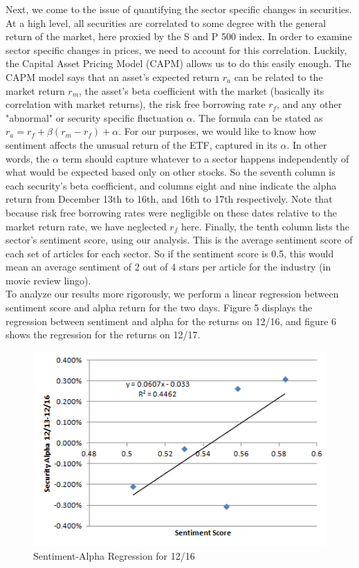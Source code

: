 \documentclass[pageno]{jpaper}
\begin{document}
\indent Next, we come to the issue of quantifying the sector specific changes in securities. At a high level, all securities are correlated to some degree with the general return of the market, here proxied by the S and P 500 index. In order to examine sector specific changes in prices, we need to account for this correlation. Luckily, the Capital Asset Pricing Model (CAPM) allows us to do this easily enough. The CAPM model says that an asset's expected return $r_a$ can be related to the market return $r_m$, the asset's beta coefficient with the market (basically its correlation with market returns), the risk free borrowing rate $r_f$, and any other "abnormal" or security specific fluctuation $\alpha$. The formula can be stated as $r_a = r_f + \beta (r_m - r_f) + \alpha$. For our purposes, we would like to know how sentiment affects the unusual return of the ETF, captured in its $\alpha$. In other words, the $\alpha$ term should capture whatever to a sector happens independently of what would be expected based only on other stocks. So the seventh column is each security's beta coefficient, and columns eight and nine indicate the alpha return from December 13th to 16th, and 16th to 17th respectively. Note that because risk free borrowing rates were negligible on these dates relative to the market return rate, we have neglected $r_f$ here. Finally, the tenth column lists the sector's sentiment score, using our analysis. This is the average sentiment score of each set of articles for each sector. So if the sentiment score is 0.5, this would mean an average sentiment of 2 out of 4 stars per article for the industry (in movie review lingo).\\
\indent To analyze our results more rigorously, we perform a linear regression between sentiment score and alpha return for the two days. Figure 5 displays the regression between sentiment and alpha for the returns on 12/16, and figure 6 shows the regression for the returns on 12/17. \\
\begin{figure}
\centering
\includegraphics[width=115mm]{returns1.png}
\caption{Sentiment-Alpha Regression for 12/16}
\label{overflow}
\end{figure}
\end{document}
